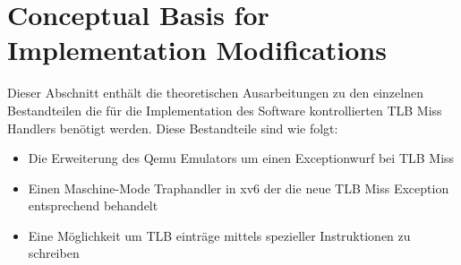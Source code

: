 \section{Conceptual Basis for Implementation Modifications}
Dieser Abschnitt enthält die theoretischen Ausarbeitungen zu den einzelnen Bestandteilen die für
die Implementation des Software kontrollierten TLB Miss Handlers benötigt werden. Diese Bestandteile
sind wie folgt:
\begin{itemize}
    \item Die Erweiterung des Qemu Emulators um einen Exceptionwurf bei TLB Miss
    \item Einen Maschine-Mode Traphandler in xv6 der die neue TLB Miss Exception entsprechend behandelt
    \item Eine Möglichkeit um TLB einträge mittels spezieller Instruktionen zu schreiben
\end{itemize}








